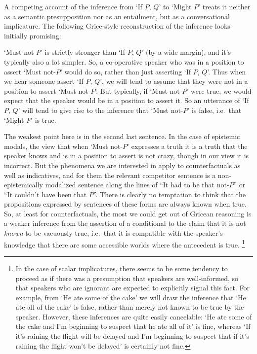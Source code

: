 \documentclass[If.tex]{subfiles}
\begin{document}
A competing account of the inference from ‘If $P$, $Q$’ to ‘Might $P$’ treats it neither as a semantic presupposition nor as an entailment, but as a conversational implicature.  The following Grice-style reconstruction of the inference looks initially promising:
\begin{prop}
	\ritem
	‘Must not-$P$’ is strictly stronger than ‘If $P$, $Q$’ (by a wide margin), and it's typically also a lot simpler.  So, a co-operative speaker who was in a position to assert ‘Must not-$P$’ would do so, rather than just asserting ‘If $P$, $Q$’.   Thus when we hear someone assert ‘If $P$, $Q$’, we will tend to assume that they were not in a position to assert ‘Must not-$P$’.  But typically, if ‘Must not-$P$’ were true, we would expect that the speaker would be in a position to assert it.  So an utterance of ‘If $P$, $Q$’ will tend to give rise to the inference that ‘Must not-$P$’ is false, i.e.\ that ‘Might $P$’ is true.  
\end{prop}
The weakest point here is in the second last sentence.  In the case of epistemic modals, the view that when ‘Must not-$P$’ expresses a truth it is a truth that the speaker knows and is in a position to assert is not crazy, though in our view it is incorrect.  But the phenomena we are interested in apply to counterfactuals as well as indicatives, and for them the relevant competitor sentence is a non-epistemically modalized sentence along the lines of “It had to be that not-$P$” or “It couldn't have been that $P$”.  There is clearly no temptation to think that the propositions expressed by sentences of these forms are always known when true.  So, at least for counterfactuals, the most we could get out of Gricean reasoning is a weaker inference from the assertion of a conditional to the claim that it is not \emph{known} to be vacuously true, i.e.\ that it is compatible with the speaker's knowledge that there are some accessible worlds where the antecedent is true.%
\footnote{In the case of scalar implicatures, there seems to be some tendency to proceed as if there was a presumption that speakers are well-informed, so that speakers who are ignorant are expected to explicitly signal this fact.  For example, from ‘He ate some of the cake’ we will draw the inference that ‘He ate all of the cake’ is false, rather than merely not known to be true by the speaker.  However, these inferences are quite easily cancelable: ‘He ate some of the cake and I'm beginning to suspect that he ate all of it’ is fine, whereas ‘If it's raining the flight will be delayed and I'm beginning to suspect that if it's raining the flight won't be delayed’ is certainly not fine.}  
\end{document}

